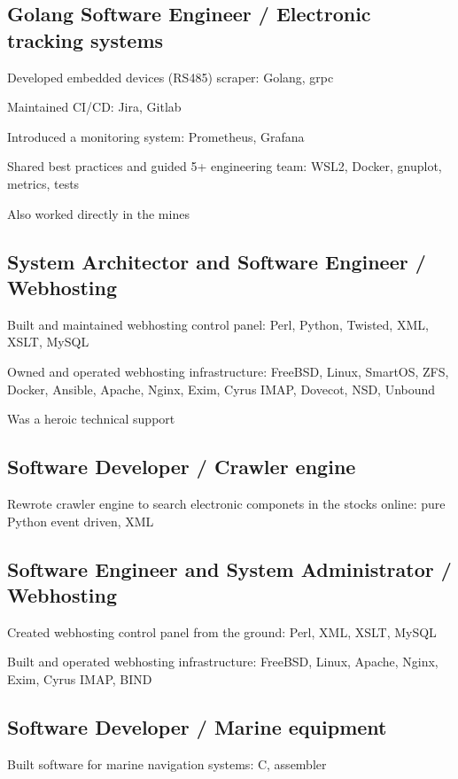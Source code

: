 \documentclass[letter,10pt]{article}
\begin{document}
\subsection{{Golang Software Engineer / Electronic tracking systems}}
\begin{zitemize}
\item Developed embedded devices (RS485) scraper: Golang, grpc
\item Maintained CI/CD: Jira, Gitlab
\item Introduced a monitoring system: Prometheus, Grafana
\item Shared best practices and guided 5+ engineering team: WSL2, Docker, gnuplot, metrics, tests
\item Also worked directly in the mines
\end{zitemize}

\subsection{{System Architector and Software Engineer / Webhosting}}
\begin{zitemize}
\item Built and maintained webhosting control panel: Perl, Python, Twisted, XML, XSLT, MySQL
\item Owned and operated webhosting infrastructure: FreeBSD, Linux, SmartOS, ZFS, Docker, Ansible, Apache, Nginx, Exim, Cyrus IMAP, Dovecot, NSD, Unbound
\item Was a heroic technical support
\end{zitemize}

\subsection{{Software Developer / Crawler engine}}
\begin{zitemize}
\item Rewrote crawler engine to search electronic componets in the stocks online: pure Python event driven, XML
\end{zitemize}

\subsection{{Software Engineer and System Administrator / Webhosting}}
\begin{zitemize}
\item Created webhosting control panel from the ground: Perl, XML, XSLT, MySQL
\item Built and operated webhosting infrastructure: FreeBSD, Linux, Apache, Nginx, Exim, Cyrus IMAP, BIND
\end{zitemize}

\subsection{{Software Developer / Marine equipment}}
\begin{zitemize}
\item Built software for marine navigation systems: C, assembler
\end{zitemize}
\end{document}
